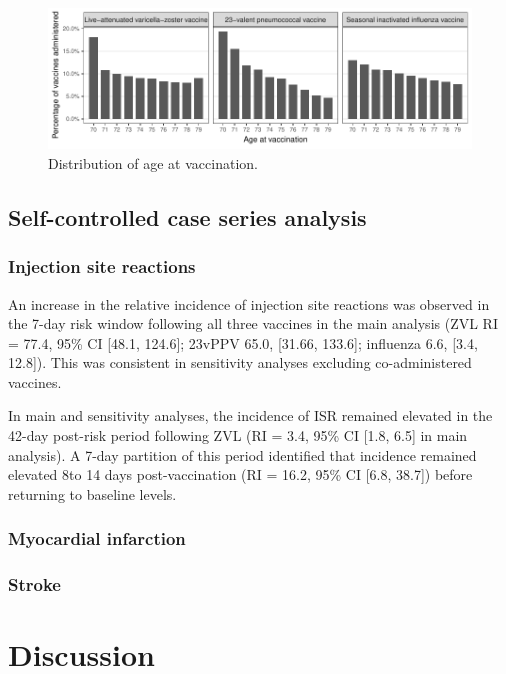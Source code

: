 \documentclass[review, endfloat]{elsarticle}
\begin{document}
\begin{figure}
\includegraphics{figs/age_at_exposure}
\caption{Distribution of age at vaccination.}
\label{fig:vax_ages}
\end{figure}


\subsection{Self-controlled case series analysis}

\subsubsection{Injection site reactions}

An increase in the relative incidence of injection site reactions was observed in the 7-day risk window following all three vaccines in the main analysis (ZVL RI = 77.4, 95\% CI [48.1, 124.6]; 23vPPV 65.0, [31.66, 133.6]; influenza 6.6, [3.4, 12.8]). This was consistent in sensitivity analyses excluding co-administered vaccines.

In main and sensitivity analyses, the incidence of ISR remained elevated in the 42-day post-risk period following ZVL (RI = 3.4, 95\% CI [1.8, 6.5] in main analysis). A 7-day partition of this period identified that incidence remained elevated 8to 14 days post-vaccination (RI = 16.2, 95\% CI [6.8, 38.7]) before returning to baseline levels.

\subsubsection{Myocardial infarction}

\subsubsection{Stroke}

\section{Discussion}
\end{document}
